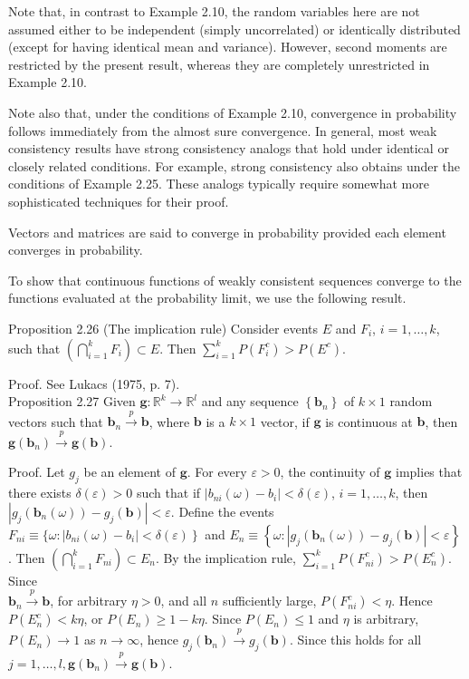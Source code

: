 \documentclass[10pt]{article}
\begin{document}
Note that, in contrast to Example 2.10, the random variables here are not assumed either to be independent (simply uncorrelated) or identically distributed (except for having identical mean and variance). However, second moments are restricted by the present result, whereas they are completely unrestricted in Example 2.10.

Note also that, under the conditions of Example 2.10, convergence in probability follows immediately from the almost sure convergence. In general, most weak consistency results have strong consistency analogs that hold under identical or closely related conditions. For example, strong consistency also obtains under the conditions of Example 2.25. These analogs typically require somewhat more sophisticated techniques for their proof.

Vectors and matrices are said to converge in probability provided each element converges in probability.

To show that continuous functions of weakly consistent sequences converge to the functions evaluated at the probability limit, we use the following result.

Proposition 2.26 (The implication rule) Consider events $E$ and $F_{i}$, $i=1, \ldots, k$, such that $\left(\bigcap_{i=1}^{k} F_{i}\right) \subset E$. Then $\sum_{i=1}^{k} P\left(F_{i}^{c}\right)>P\left(E^{c}\right)$.

Proof. See Lukacs (1975, p. 7).\\
Proposition 2.27 Given $\mathbf{g}: \mathbb{R}^{k} \rightarrow \mathbb{R}^{l}$ and any sequence $\left\{\mathbf{b}_{n}\right\}$ of $k \times 1$ random vectors such that $\mathbf{b}_{n} \xrightarrow{p} \mathbf{b}$, where $\mathbf{b}$ is a $k \times 1$ vector, if $\mathbf{g}$ is continuous at $\mathbf{b}$, then $\mathbf{g}\left(\mathbf{b}_{n}\right) \xrightarrow{p} \mathbf{g}(\mathbf{b})$.

Proof. Let $g_{j}$ be an element of $\mathbf{g}$. For every $\varepsilon>0$, the continuity of $\mathbf{g}$ implies that there exists $\delta(\varepsilon)>0$ such that if $\left|b_{n i}(\omega)-b_{i}\right|<\delta(\varepsilon)$, $i=1, \ldots, k$, then $\left|g_{j}\left(\mathbf{b}_{n}(\omega)\right)-g_{j}(\mathbf{b})\right|<\varepsilon$. Define the events $F_{n i} \equiv\{\omega: \left.\left|b_{n i}(\omega)-b_{i}\right|<\delta(\varepsilon)\right\}$ and $E_{n} \equiv\left\{\omega:\left|g_{j}\left(\mathbf{b}_{n}(\omega)\right)-g_{j}(\mathbf{b})\right|<\varepsilon\right\}$. Then $\left(\bigcap_{i=1}^{k} F_{n i}\right) \subset E_{n}$. By the implication rule, $\sum_{i=1}^{k} P\left(F_{n i}^{c}\right)>P\left(E_{n}^{c}\right)$. Since\\
$\mathbf{b}_{n} \xrightarrow{p} \mathbf{b}$, for arbitrary $\eta>0$, and all $n$ sufficiently large, $P\left(F_{n i}^{c}\right)<\eta$. Hence $P\left(E_{n}^{c}\right)<k \eta$, or $P\left(E_{n}\right) \geq 1-k \eta$. Since $P\left(E_{n}\right) \leq 1$ and $\eta$ is arbitrary, $P\left(E_{n}\right) \rightarrow 1$ as $n \rightarrow \infty$, hence $g_{j}\left(\mathbf{b}_{n}\right) \xrightarrow{p} g_{j}(\mathbf{b})$. Since this holds for all $j=1, \ldots, l, \mathbf{g}\left(\mathbf{b}_{n}\right) \xrightarrow{p} \mathbf{g}(\mathbf{b})$.
\end{document}
